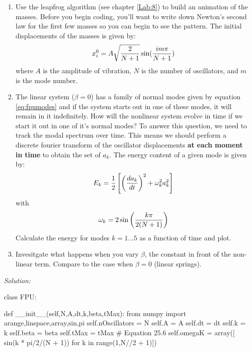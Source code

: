 \begin{enumerate}
\begin{enumerate}
\item Use the leapfrog algorithm (see chapter \ref{Lab:8}) to build an
  animation of the masses.  Before you begin coding, you'll want to write down Newton's second
  law for the first few masses so you can begin to see the pattern. The initial displacements of the masses is
  given by: 
\begin{equation}\label{eq:fpumodes}
x_i^0 = A \sqrt{2\over N + 1} \sin({i m \pi\over N + 1})
\end{equation}
where $A$ is the amplitude of vibration, $N$ is the number of
oscillators, and $m$ is the mode number.
\item The linear system ($\beta
  =0$) has a family of normal modes given by equation
  \eqref{eq:fpumodes} and if the system starts out in one of these
  modes, it will remain in it indefinitely.  How will the nonlinear system
  evolve in time if we start it out in one of it's normal modes? To
  answer this question, we need to track the modal spectrum over time.  This means we
  should perform a discrete fourier transform of the oscillator
  displacements \textbf{at each moment in time} to obtain the set of
  $a_k$. The energy content of a given mode is given by:
\begin{equation}
E_k = {1\over 2}\left[ \left({d a_k \over dt} \right)^2 + \omega_k^2 a_k^2\right]
\end{equation}
with 
\begin{equation}
\omega_k = 2 \sin \left( {k \pi\over 2 (N + 1)}\right)
\end{equation}
Calculate the energy for modes $k = 1...5$ as a function of time and
plot.
\item Invesitgate what happens when you vary $\beta$, the constant in
  front of the non-linear term.  Compare to the case when $\beta = 0$
  (linear springs).
\end{enumerate}
\ifsolutions
\textit{Solution:}\\
\begin{codeexample}
\begin{VerbatimOut}{\listingFile}


class FPU:

    def __init__(self,N,A,dt,k,beta,tMax):
        from numpy import arange,linspace,array,sin,pi
        self.nOscillators = N
        self.A = A
        self.dt = dt
        self.k = k
        self.beta = beta
        self.tMax = tMax
        # Equation 25.6
        self.omegaK = array([ sin(k * pi/2/(N + 1)) for k in range(1,N//2 + 1)])



\end{VerbatimOut}
\end{codeexample}
\end{enumerate}
